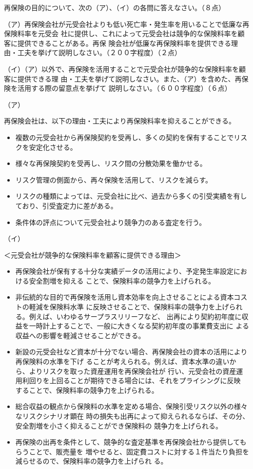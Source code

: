 \documentclass[report,gutter=10mm,fore-edge=10mm,uplatex,dvipdfmx]{jlreq}
\begin{document}
再保険の目的について、次の（ア）、（イ）の各問に答えなさい。（８点）

（ア）再保険会社が元受会社よりも低い死亡率・発生率を用いることで低廉な再保険料率を元受会
社に提供し、これによって元受会社は競争的な保険料率を顧客に提供できることがある。再保
険会社が低廉な再保険料率を提供できる理由・工夫を挙げて説明しなさい。（２００字程度）（２点）

（イ）（ア）以外で、再保険を活用することで元受会社が競争的な保険料率を顧客に提供できる理
由・工夫を挙げて説明しなさい。また、（ア）を含めた、再保険を活用する際の留意点を挙げて
説明しなさい。（６００字程度）（６点）

\answer{}
（ア）

再保険会社は、以下の理由・工夫により再保険料率を抑えることができる。
\begin{itemize}
\item[] 複数の元受会社から再保険契約を受再し、多くの契約を保有することでリスクを安定化させる。
\item[] 様々な再保険契約を受再し、リスク間の分散効果を働かせる。
\item[] リスク管理の側面から、再々保険を活用して、リスクを減らす。
\item[] リスクの種類によっては、元受会社に比べ、過去から多くの引受実績を有しており、引受査定力に差がある。
\item[] 条件体の評点について元受会社より競争力のある査定を行う。
\end{itemize}

（イ）

＜元受会社が競争的な保険料率を顧客に提供できる理由＞

\begin{itemize}
\item[] 再保険会社が保有する十分な実績データの活用により、予定発生率設定における安全割増を抑える
ことで、保険料率の競争力を上げられる。
\item[] 非伝統的な目的で再保険を活用し資本効率を向上させることによる資本コストの軽減を保険料水準
に反映させることで、保険料率の競争力を上げられる。例えば、いわゆるサープラスリリーフなど、
出再により契約初年度に収益を一時計上することで、一般に大きくなる契約初年度の事業費支出に
よる収益への影響を軽減させることができる。
\item[] 新設の元受会社など資本が十分でない場合、再保険会社の資本の活用により再保険料の水準を下げ
ることが考えられる。例えば、資本水準の違いから、よりリスクを取った資産運用を再保険会社が
行い、元受会社の資産運用利回りを上回ることが期待できる場合には、それをプライシングに反映
することで、保険料率の競争力を上げられる。
\item[] 総合収益の観点から保険料の水準を定める場合、保険引受リスク以外の様々なリスクシナリオ顕在
時の損失も出再によって抑えられるならば、その分、安全割増を小さく抑えることができ保険料の
競争力を上げられる。
\item[] 再保険の出再を条件として、競争的な査定基準を再保険会社から提供してもらうことで、販売量を
増やせると、固定費コストに対する１件当たり負担を減らせるので、保険料率の競争力を上げられ
る。
\end{itemize}
\end{document}
